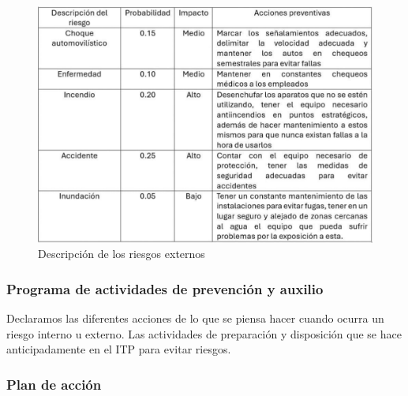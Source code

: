     \begin{figure}[H]
        \centering
        \includegraphics[trim = {1mm 1mm 1mm 1mm},clip,scale=0.3]{8/Img/Riesgos.pdf}
        \caption{Descripción de los riesgos externos}
        \label{Riesgos externos}
    \end{figure}
    \subsubsection{Programa de actividades de prevención y auxilio}
    
    Declaramos las diferentes acciones de lo que se piensa hacer cuando ocurra un riesgo interno u externo. 
    Las actividades de preparación y disposición que se hace anticipadamente en el ITP para evitar riesgos.
    \subsubsection{Plan de acción}
    
